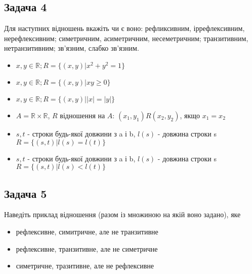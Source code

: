 \documentclass{article}
\begin{document}
\subsection*{Задача 4}
Для наступних відношень вкажіть чи є воно: рефликсивним, іррефлексивним, нерефлексивним; симетричним, асиметричним, несеметричним;
транзитивним, нетранзитивним; зв'язним, слабко зв'язним.
\begin{itemize}
    \item $x,y \in \mathbb{R}; R = \{(x,y)|x^2+y^2=1\}$
    \item $x,y \in \mathbb{R}; R = \{(x,y)|xy \geq 0\}$
    \item $x,y \in \mathbb{R}; R = \{(x,y)||x| = |y|\}$
    \item $A = \mathbb{R} \times \mathbb{R}$, $R$ відношення на $A$: $(x_1,y_1)R(x_2,y_2)$, якщо $x_1 = x_2$
    \item $s,t$ - строки будь-якої довжини з a і b, $l(s)$ - довжина строки s $R = \{(s,t)|l(s) = l(t)\}$
    \item $s,t$ - строки будь-якої довжини з a і b, $l(s)$ - довжина строки s $R = \{(s,t)|l(s) < l(t)\}$
\end{itemize}

\subsection*{Задача 5}
Наведіть приклад відношення (разом із множиною на якій воно задано), яке
\begin{itemize}
    \item рефлексивне, симитричне, але не транзитивне
    \item рефлексивне, транзитивне, але не симетричне
    \item симетричне, тразитивне, але не рефлексивне
\end{itemize}
\end{document}
